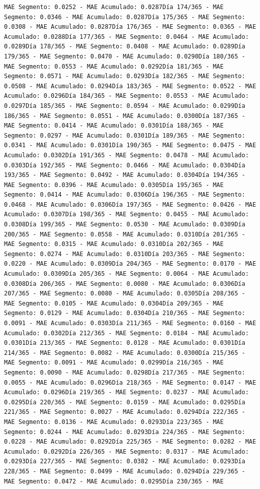\documentclass[
]{book}
\begin{document}
\begin{verbatim}
MAE Segmento: 0.0252 - MAE Acumulado: 0.0287Día 174/365 - MAE Segmento: 0.0346 - MAE Acumulado: 0.0287Día 175/365 - MAE Segmento: 0.0308 - MAE Acumulado: 0.0287Día 176/365 - MAE Segmento: 0.0365 - MAE Acumulado: 0.0288Día 177/365 - MAE Segmento: 0.0464 - MAE Acumulado: 0.0289Día 178/365 - MAE Segmento: 0.0408 - MAE Acumulado: 0.0289Día 179/365 - MAE Segmento: 0.0470 - MAE Acumulado: 0.0290Día 180/365 - MAE Segmento: 0.0553 - MAE Acumulado: 0.0292Día 181/365 - MAE Segmento: 0.0571 - MAE Acumulado: 0.0293Día 182/365 - MAE Segmento: 0.0508 - MAE Acumulado: 0.0294Día 183/365 - MAE Segmento: 0.0522 - MAE Acumulado: 0.0296Día 184/365 - MAE Segmento: 0.0553 - MAE Acumulado: 0.0297Día 185/365 - MAE Segmento: 0.0594 - MAE Acumulado: 0.0299Día 186/365 - MAE Segmento: 0.0551 - MAE Acumulado: 0.0300Día 187/365 - MAE Segmento: 0.0414 - MAE Acumulado: 0.0301Día 188/365 - MAE Segmento: 0.0297 - MAE Acumulado: 0.0301Día 189/365 - MAE Segmento: 0.0341 - MAE Acumulado: 0.0301Día 190/365 - MAE Segmento: 0.0475 - MAE Acumulado: 0.0302Día 191/365 - MAE Segmento: 0.0478 - MAE Acumulado: 0.0303Día 192/365 - MAE Segmento: 0.0466 - MAE Acumulado: 0.0304Día 193/365 - MAE Segmento: 0.0492 - MAE Acumulado: 0.0304Día 194/365 - MAE Segmento: 0.0396 - MAE Acumulado: 0.0305Día 195/365 - MAE Segmento: 0.0414 - MAE Acumulado: 0.0306Día 196/365 - MAE Segmento: 0.0468 - MAE Acumulado: 0.0306Día 197/365 - MAE Segmento: 0.0426 - MAE Acumulado: 0.0307Día 198/365 - MAE Segmento: 0.0455 - MAE Acumulado: 0.0308Día 199/365 - MAE Segmento: 0.0530 - MAE Acumulado: 0.0309Día 200/365 - MAE Segmento: 0.0558 - MAE Acumulado: 0.0310Día 201/365 - MAE Segmento: 0.0315 - MAE Acumulado: 0.0310Día 202/365 - MAE Segmento: 0.0274 - MAE Acumulado: 0.0310Día 203/365 - MAE Segmento: 0.0220 - MAE Acumulado: 0.0309Día 204/365 - MAE Segmento: 0.0170 - MAE Acumulado: 0.0309Día 205/365 - MAE Segmento: 0.0064 - MAE Acumulado: 0.0308Día 206/365 - MAE Segmento: 0.0080 - MAE Acumulado: 0.0306Día 207/365 - MAE Segmento: 0.0080 - MAE Acumulado: 0.0305Día 208/365 - MAE Segmento: 0.0105 - MAE Acumulado: 0.0304Día 209/365 - MAE Segmento: 0.0129 - MAE Acumulado: 0.0304Día 210/365 - MAE Segmento: 0.0091 - MAE Acumulado: 0.0303Día 211/365 - MAE Segmento: 0.0160 - MAE Acumulado: 0.0302Día 212/365 - MAE Segmento: 0.0184 - MAE Acumulado: 0.0301Día 213/365 - MAE Segmento: 0.0128 - MAE Acumulado: 0.0301Día 214/365 - MAE Segmento: 0.0082 - MAE Acumulado: 0.0300Día 215/365 - MAE Segmento: 0.0091 - MAE Acumulado: 0.0299Día 216/365 - MAE Segmento: 0.0090 - MAE Acumulado: 0.0298Día 217/365 - MAE Segmento: 0.0055 - MAE Acumulado: 0.0296Día 218/365 - MAE Segmento: 0.0147 - MAE Acumulado: 0.0296Día 219/365 - MAE Segmento: 0.0237 - MAE Acumulado: 0.0295Día 220/365 - MAE Segmento: 0.0159 - MAE Acumulado: 0.0295Día 221/365 - MAE Segmento: 0.0027 - MAE Acumulado: 0.0294Día 222/365 - MAE Segmento: 0.0136 - MAE Acumulado: 0.0293Día 223/365 - MAE Segmento: 0.0244 - MAE Acumulado: 0.0293Día 224/365 - MAE Segmento: 0.0228 - MAE Acumulado: 0.0292Día 225/365 - MAE Segmento: 0.0282 - MAE Acumulado: 0.0292Día 226/365 - MAE Segmento: 0.0317 - MAE Acumulado: 0.0293Día 227/365 - MAE Segmento: 0.0382 - MAE Acumulado: 0.0293Día 228/365 - MAE Segmento: 0.0499 - MAE Acumulado: 0.0294Día 229/365 - MAE Segmento: 0.0472 - MAE Acumulado: 0.0295Día 230/365 - MAE 
\end{verbatim}
\end{document}
